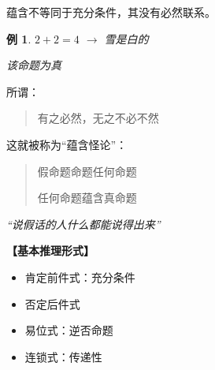 \documentclass[12pt,onecolumn,a4paper]{book}
\newtheorem*{example}{例}
\numberwithin{table}{subsection}
\numberwithin{equation}{subsection}
\begin{document}
蕴含不等同于充分条件，其没有必然联系。

\begin{example}
    $2+2=4$ $\rightarrow$ 雪是白的

    该命题为真
\end{example}

所谓：
\begin{quotation}
    有之必然，无之不必不然
\end{quotation}

这就被称为“蕴含怪论”：
\begin{quotation}
    假命题命题任何命题

    任何命题蕴含真命题
\end{quotation}

\emph{“说假话的人什么都能说得出来”}

\textbf{【基本推理形式】}

\begin{itemize}[itemsep=0pt,parsep=0pt]
    \item 肯定前件式：充分条件
    \item 否定后件式
    \item 易位式：逆否命题
    \item 连锁式：传递性
\end{itemize}
\end{document}
